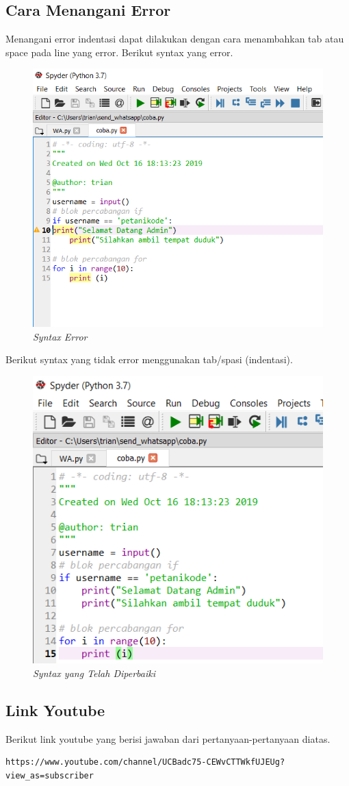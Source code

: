 \subsection{Cara Menangani Error}
Menangani error indentasi dapat dilakukan dengan cara menambahkan tab atau space pada line yang error.
Berikut syntax yang error.
\begin{figure}[H]
    \centering
    \includegraphics[scale=0.7]{figures/indentasi}
    \caption{\textit{Syntax Error}}
    \label{Syntax Error}
\end{figure}
Berikut syntax yang tidak error menggunakan tab/spasi (indentasi).
\begin{figure}[H]
    \centering
    \includegraphics[scale=0.7]{figures/indentasicoy}
    \caption{\textit{Syntax yang Telah Diperbaiki}}
    \label{Syntax Error}
\end{figure}

\subsection{Link Youtube}
Berikut link youtube yang berisi jawaban dari pertanyaan-pertanyaan diatas.
\begin{verbatim}
https://www.youtube.com/channel/UCBadc75-CEWvCTTWkfUJEUg?view_as=subscriber
\end{verbatim}